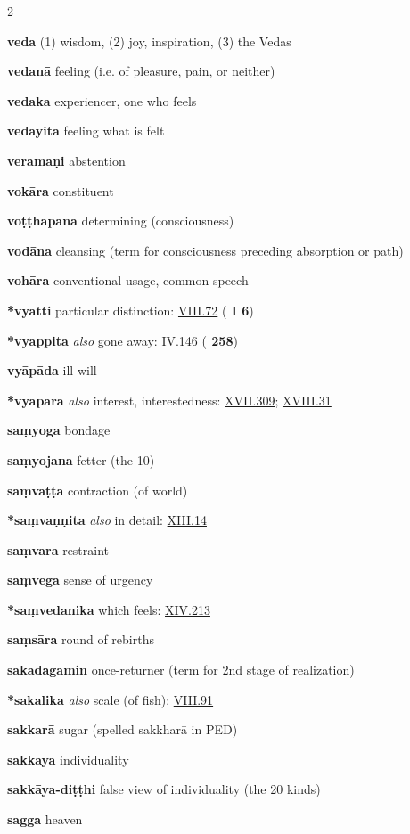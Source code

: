 \begin{multicols}{2}
\begin{vismHanging}
\par\textbf{veda} (1) wisdom, (2) joy, inspiration, (3) the Vedas 
\par\textbf{vedanā} feeling (i.e. of pleasure, pain, or neither) 
\par\textbf{vedaka} experiencer, one who feels 
\par\textbf{vedayita} feeling what is felt
\par\textbf{veramaṇi} abstention
\par\textbf{vokāra} constituent
\par\textbf{voṭṭhapana} determining (consciousness) 
\par\textbf{vodāna} cleansing (term for consciousness preceding absorption or path)
\par\textbf{vohāra} conventional usage, common speech 
\par\textbf{*vyatti} particular distinction: \hyperlink{VIII.72}{VIII.72}{} (\textbf{\cite{M-a} I 6}) 
\par\textbf{*vyappita} \emph{also }gone away: \hyperlink{IV.146}{IV.146}{} (\textbf{\cite{Vibh} 258}) 
\par\textbf{vyāpāda} ill will
\par\textbf{*vyāpāra} \emph{also }interest, interestedness: \hyperlink{XVII.309}{XVII.309}{}; \hyperlink{XVIII.31}{XVIII.31}{}
\par\textbf{saṃyoga} bondage
\par\textbf{saṃyojana} fetter (the 10)
\par\textbf{saṃvaṭṭa} contraction (of world)
\par\textbf{*saṃvaṇṇita} \emph{also }in detail: \hyperlink{XIII.14}{XIII.14}{}
\par\textbf{saṃvara} restraint
\par\textbf{saṃvega} sense of urgency
\par\textbf{*saṃvedanika} which feels: \hyperlink{XIV.213}{XIV.213}{}
\par\textbf{saṃsāra} round of rebirths
\par\textbf{sakadāgāmin} once-returner (term for 2nd stage of realization) 
\par\textbf{*sakalika} \emph{also }scale (of fish): \hyperlink{VIII.91}{VIII.91}{}
\par\textbf{sakkarā} sugar (spelled sakkharā in PED) 
\par\textbf{sakkāya} individuality
\par\textbf{sakkāya-diṭṭhi} false view of individuality (the 20 kinds) 
\par\textbf{sagga} heaven

\end{vismHanging}
\end{multicols}
